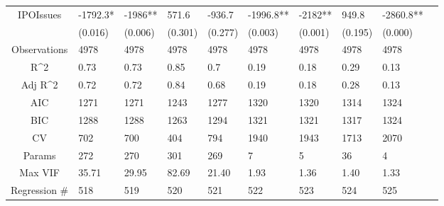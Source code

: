 \documentclass{article}
\begin{document}
\begin{table}[H]
\begin{tabular}{|clllllllll|}
  IPOIssues & -1792.3* & -1986** & 571.6 & -936.7 & -1996.8** & -2182** & 949.8 & -2860.8** & \\ 
   & (0.016) & (0.006) & (0.301) & (0.277) & (0.003) & (0.001) & (0.195) & (0.000) & \\ 
  \hline 
 Observations & 4978 & 4978 & 4978 & 4978 & 4978 & 4978 & 4978 & 4978 & \\ 
  R^2 & 0.73 & 0.73 & 0.85 & 0.7 & 0.19 & 0.18 & 0.29 & 0.13 & \\ 
  Adj R^2 & 0.72 & 0.72 & 0.84 & 0.68 & 0.19 & 0.18 & 0.28 & 0.13 & \\ 
  AIC & 1271 & 1271 & 1243 & 1277 & 1320 & 1320 & 1314 & 1324 & \\ 
  BIC & 1288 & 1288 & 1263 & 1294 & 1321 & 1321 & 1317 & 1324 & \\ 
  CV & 702 & 700 & 404 & 794 & 1940 & 1943 & 1713 & 2070 & \\ 
  Params & 272 & 270 & 301 & 269 & 7 & 5 & 36 & 4 & \\ 
  Max VIF & 35.71 & 29.95 & 82.69 & 21.40 & 1.93 & 1.36 & 1.40 & 1.33 & \\ 
  Regression \# & 518 & 519 & 520 & 521 & 522 & 523 & 524 & 525 & \\ 
   \hline
\end{tabular}
 
\end{table}
\end{document}
